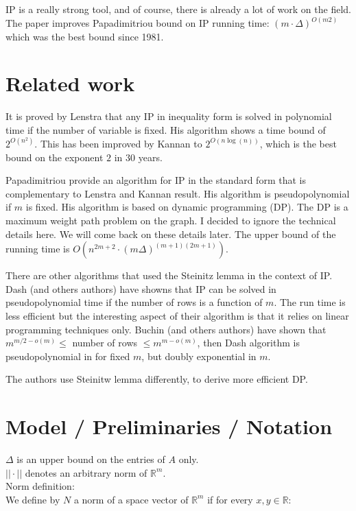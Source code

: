 \documentclass[12pt]{article}
\theoremstyle{definition}
\begin{document}
IP is a really strong tool, and of course, there is already a lot of work on the field. The paper improves Papadimitriou bound on IP running time:  $(m \cdot \Delta)^{O(m2)}$ which was the best bound since 1981. 

\section{Related work}

It is proved by Lenstra that any IP in inequality form is solved in polynomial time if the number of variable is fixed. His algorithm shows a time bound of $2^{O(n^2)}$. This has been improved by Kannan to $2^{O(n \log(n))}$, which is the best bound on the exponent $2$ in $30$ years.

Papadimitriou provide an algorithm for IP in the standard form that is complementary to Lenstra and Kannan result. His algorithm is pseudopolynomial if $m$ is fixed. His algorithm is based on dynamic programming (DP). The DP is a maximum weight path problem on the graph. I decided to ignore the technical details here. We will come back on these details later. The upper bound of the running time is $O(n^{2m+2} \cdot (m \Delta) ^ {(m+1)(2m+1)})$.

There are other algorithms that used the Steinitz lemma in the context of IP. Dash (and others authors) have showns that IP can be solved in pseudopolynomial time if the number of rows is a function of $m$. The run time is less efficient but the interesting aspect of their algorithm is that it relies on linear programming techniques only. Buchin (and others authors) have shown that $m^{m/2-o(m)} \leq$ number of rows $\leq m^{m-o(m)}$, then Dash algorithm is pseudopolynomial in for fixed $m$, but doubly exponential in $m$. 

The authors use Steinitw lemma differently, to derive more efficient DP.

\section{Model / Preliminaries / Notation}

$\Delta$ is an upper bound on the entries of $A$ only. \\
$|| \cdot ||$ denotes an arbitrary norm of $\mathbb{R}^m$. \\
Norm definition: \\
We define by $N$ a norm of a space vector of $\mathbb{R}^m$ if for every $x, y \in \mathbb{R}$:
\end{document}
